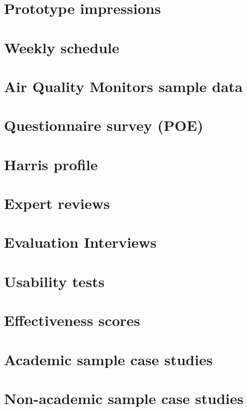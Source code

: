 \begin{appendices}
\section{Prototype impressions}
\label{appendix:prototype}

\section{Weekly schedule}
\label{appendix:schedule}

\section{Air Quality Monitors sample data}
\label{appendix:monitors}

\section{Questionnaire survey (POE)}
\label{appendix:survey}

\section{Harris profile}
\label{appendix:profile}

\section{Expert reviews}
\label{appendix:expert}

\section{Evaluation Interviews}
\label{appendix:evaluation}

\section{Usability tests}
\label{appendix:usability}

\section{Effectiveness scores}
\label{appendix:effectiveness}

\section{Academic sample case studies}
\label{appendix:academic}

\section{Non-academic sample case studies}
\label{appendix:nonacademic}

\end{appendices}
